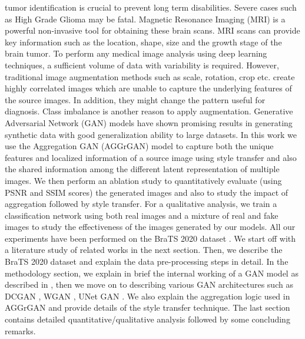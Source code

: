 \documentclass[10pt,journal,compsoc]{IEEEtran}
\begin{document}
% 
% 
% 
% 


 tumor identification is crucial to prevent long term disabilities. Severe cases such as High Grade Glioma may be fatal. Magnetic Resonance
Imaging (MRI) is a powerful non-invasive tool for obtaining these brain scans. MRI scans can provide key information such as the location, shape, size and the growth
stage of the brain tumor. To perform any medical image analysis using deep learning techniques, a sufficient volume of data with variability is required.
However, traditional image augmentation methods such as scale, rotation, crop etc. create highly correlated images which are unable to capture the underlying features
of the source images. In addition, they might change the pattern useful for diagnosis. Class imbalance is another reason to apply augmentation. Generative Adversarial
Network (GAN) models have shown promising results in generating synthetic data with good generalization ability to large datasets. In this work we use the Aggregation
GAN (AGGrGAN) model to capture both the unique features and localized information of a source image using style transfer and also the shared information
among the different latent representation of multiple images. We then perform an ablation study to quantitatively evaluate (using PSNR and SSIM scores) the generated
images and also to study the impact of aggregation followed by style transfer. For a qualitative analysis, we train a classification network using both real images and
a mixture of real and fake images to study the effectiveness of the images generated by our models. All our experiments have been performed on the BraTS 2020 dataset
\cite{Bakas2017} \cite{Menze2015} \cite{DBLP:journals/corr/abs-1811-02629}. We start off with a literature study of related works in the next section. Then, we describe
the BraTS 2020 dataset and explain the data pre-processing steps in detail. In the methodology section, we explain in brief the internal working of a GAN model as described
in \cite{Goodfellow2014}, then we move on to describing various GAN architectures such as DCGAN \cite{Radford2015}, WGAN \cite{Arjovsky2017}, UNet GAN \cite{Schonfeld2020}.
We also explain the aggregation logic used in AGGrGAN and provide details of the style transfer technique. The last section contains detailed quantitative/qualitative analysis followed by some concluding remarks.
\end{document}
